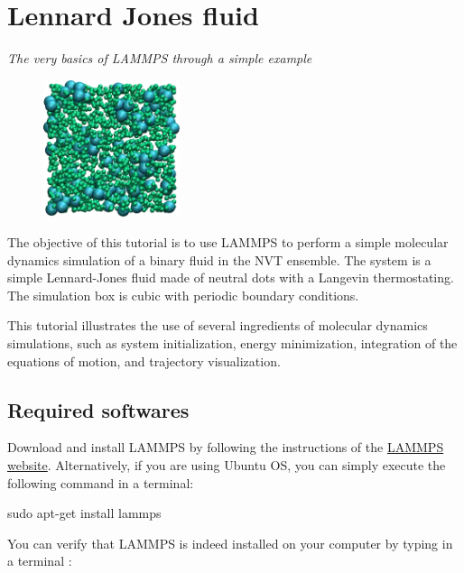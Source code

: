 \chapter{Lennard Jones fluid}

\vspace{-1cm} \noindent \textcolor{graytitle}{\textit{{\Large The very basics of LAMMPS through a simple example}}\vspace{0.5cm} }

\noindent \hspace{-0.45cm}\begin{figure}
\includegraphics[width=4cm]{tutorials/level0/lennard-jones-fluid/binary_LJ_fluid_light.png}
\end{figure}

\noindent The objective of this tutorial is to use
LAMMPS to perform a simple molecular dynamics simulation
of a binary fluid in the NVT ensemble. The system is a simple Lennard-Jones fluid
made of neutral dots with a Langevin thermostating. The
simulation box is cubic with periodic boundary conditions.

This tutorial illustrates the use of several ingredients of
molecular dynamics simulations, such as system initialization,
energy minimization, integration of the equations of motion,
and trajectory visualization.

\section{Required softwares}

\noindent Download and install LAMMPS by following the instructions of the \href{https://lammps.sandia.gov}{LAMMPS website}.
Alternatively, if you are using Ubuntu OS, you can simply execute the
following command in a terminal:

\begin{lcverbatim}
sudo apt-get install lammps
\end{lcverbatim}

\noindent You can verify that LAMMPS is indeed installed on your
computer by typing in a terminal :

